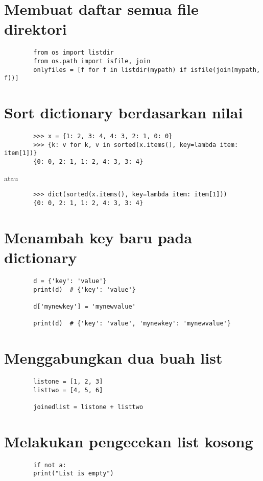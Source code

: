 \documentclass{article}
\begin{document}
	\section {Membuat daftar semua file direktori}
	\begin{lstlisting}
		from os import listdir
		from os.path import isfile, join
		onlyfiles = [f for f in listdir(mypath) if isfile(join(mypath, f))]
	\end{lstlisting}

	\section {Sort dictionary berdasarkan nilai}
	\begin{lstlisting}
		>>> x = {1: 2, 3: 4, 4: 3, 2: 1, 0: 0}
		>>> {k: v for k, v in sorted(x.items(), key=lambda item: item[1])}
		{0: 0, 2: 1, 1: 2, 4: 3, 3: 4}
	\end{lstlisting}
	atau
	\begin{lstlisting}
		>>> dict(sorted(x.items(), key=lambda item: item[1]))
		{0: 0, 2: 1, 1: 2, 4: 3, 3: 4}
	\end{lstlisting}

	\section {Menambah key baru pada dictionary}
	\begin{lstlisting}
		d = {'key': 'value'}
		print(d)  # {'key': 'value'}
		
		d['mynewkey'] = 'mynewvalue'
		
		print(d)  # {'key': 'value', 'mynewkey': 'mynewvalue'}
	\end{lstlisting}

	\section {Menggabungkan dua buah list}
	\begin{lstlisting}
		listone = [1, 2, 3]
		listtwo = [4, 5, 6]
		
		joinedlist = listone + listtwo
	\end{lstlisting}

	\section {Melakukan pengecekan list kosong}
	\begin{lstlisting}
		if not a:
		print("List is empty")
	\end{lstlisting}
\end{document}
